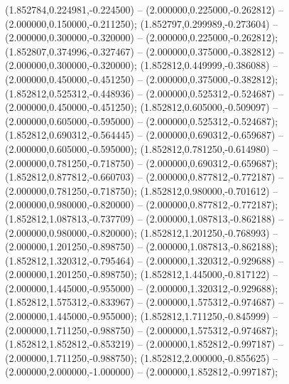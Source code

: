  (1.852784,0.224981,-0.224500) -- (2.000000,0.225000,-0.262812) -- (2.000000,0.150000,-0.211250);
 (1.852797,0.299989,-0.273604) -- (2.000000,0.300000,-0.320000) -- (2.000000,0.225000,-0.262812);
 (1.852807,0.374996,-0.327467) -- (2.000000,0.375000,-0.382812) -- (2.000000,0.300000,-0.320000);
 (1.852812,0.449999,-0.386088) -- (2.000000,0.450000,-0.451250) -- (2.000000,0.375000,-0.382812);
 (1.852812,0.525312,-0.448936) -- (2.000000,0.525312,-0.524687) -- (2.000000,0.450000,-0.451250);
 (1.852812,0.605000,-0.509097) -- (2.000000,0.605000,-0.595000) -- (2.000000,0.525312,-0.524687);
 (1.852812,0.690312,-0.564445) -- (2.000000,0.690312,-0.659687) -- (2.000000,0.605000,-0.595000);
 (1.852812,0.781250,-0.614980) -- (2.000000,0.781250,-0.718750) -- (2.000000,0.690312,-0.659687);
 (1.852812,0.877812,-0.660703) -- (2.000000,0.877812,-0.772187) -- (2.000000,0.781250,-0.718750);
 (1.852812,0.980000,-0.701612) -- (2.000000,0.980000,-0.820000) -- (2.000000,0.877812,-0.772187);
 (1.852812,1.087813,-0.737709) -- (2.000000,1.087813,-0.862188) -- (2.000000,0.980000,-0.820000);
 (1.852812,1.201250,-0.768993) -- (2.000000,1.201250,-0.898750) -- (2.000000,1.087813,-0.862188);
 (1.852812,1.320312,-0.795464) -- (2.000000,1.320312,-0.929688) -- (2.000000,1.201250,-0.898750);
 (1.852812,1.445000,-0.817122) -- (2.000000,1.445000,-0.955000) -- (2.000000,1.320312,-0.929688);
 (1.852812,1.575312,-0.833967) -- (2.000000,1.575312,-0.974687) -- (2.000000,1.445000,-0.955000);
 (1.852812,1.711250,-0.845999) -- (2.000000,1.711250,-0.988750) -- (2.000000,1.575312,-0.974687);
 (1.852812,1.852812,-0.853219) -- (2.000000,1.852812,-0.997187) -- (2.000000,1.711250,-0.988750);
 (1.852812,2.000000,-0.855625) -- (2.000000,2.000000,-1.000000) -- (2.000000,1.852812,-0.997187);

